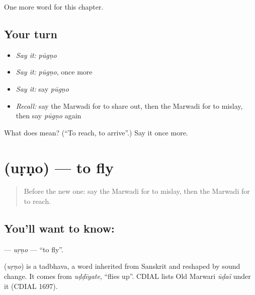 \begin{grammarlens}[title={What you've built}]
One more word for this chapter.
\end{grammarlens}

\subsection*{Your turn}
\begin{itemize}
\raggedright
  \item \emph{Say it:} \emph{pūgṇo}
  \item \emph{Say it:} \emph{pūgṇo}, once more
  \item \emph{Say it:} say \emph{pūgṇo}
  \item \emph{Recall:} say the Marwadi for to share out, then the Marwadi for to mislay, then say \emph{pūgṇo} again
\end{itemize}

\begin{tcolorbox}[breakable,colback=teal!4,colframe=teal!35!black,title={Before you move on}]
What does  mean? (\textquotedblleft{}To reach, to arrive\textquotedblright{}.) Say it once more.
\end{tcolorbox}
\section[\texorpdfstring{\mw{उडणो} (uṛṇo)}{उडणो (uṛṇo)}]{ (uṛṇo) — to fly}

\label{lesson:MW-C110-urno}



\begin{quote}
Before the new one: say the Marwadi for to mislay, then the Marwadi for to reach.
\end{quote}

\subsection*{You'll want to know: }
\textbf{} — \emph{uṛṇo} — \textquotedblleft{}to fly\textquotedblright{}.

\begin{cousinweb}
\textbf{} (\emph{uṛṇo}) is a tadbhava, a word inherited from Sanskrit and reshaped by sound change. It comes from \emph{uḍḍīyate}, \textquotedblleft{}flies up\textquotedblright{}. CDIAL lists Old Marwari \emph{ūḍaï} under it (CDIAL 1697).
\end{cousinweb}

